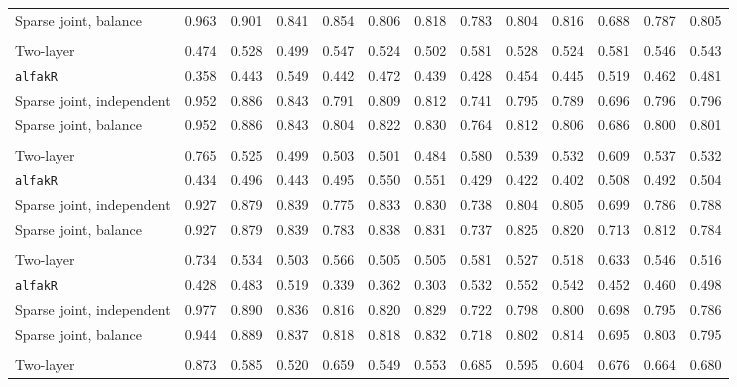 \begin{center}
\begin{tabular}{l*{12}{r}}
\quad Sparse joint, balance & 0.963 & 0.901 & 0.841 & 0.854 & 0.806 & 0.818 & 0.783 & 0.804 & 0.816 & 0.688 & 0.787 & 0.805 \\
\addlinespace[2pt]
\multicolumn{13}{l}{\textit{500/700, 360 d}} \\
\quad Two-layer & 0.474 & 0.528 & 0.499 & 0.547 & 0.524 & 0.502 & 0.581 & 0.528 & 0.524 & 0.581 & 0.546 & 0.543 \\
\quad \texttt{alfakR} & 0.358 & 0.443 & 0.549 & 0.442 & 0.472 & 0.439 & 0.428 & 0.454 & 0.445 & 0.519 & 0.462 & 0.481 \\
\quad Sparse joint, independent & 0.952 & 0.886 & 0.843 & 0.791 & 0.809 & 0.812 & 0.741 & 0.795 & 0.789 & 0.696 & 0.796 & 0.796 \\
\quad Sparse joint, balance & 0.952 & 0.886 & 0.843 & 0.804 & 0.822 & 0.830 & 0.764 & 0.812 & 0.806 & 0.686 & 0.800 & 0.801 \\
\addlinespace[2pt]
\multicolumn{13}{l}{\textit{500/700, 1080 d}} \\
\quad Two-layer & 0.765 & 0.525 & 0.499 & 0.503 & 0.501 & 0.484 & 0.580 & 0.539 & 0.532 & 0.609 & 0.537 & 0.532 \\
\quad \texttt{alfakR} & 0.434 & 0.496 & 0.443 & 0.495 & 0.550 & 0.551 & 0.429 & 0.422 & 0.402 & 0.508 & 0.492 & 0.504 \\
\quad Sparse joint, independent & 0.927 & 0.879 & 0.839 & 0.775 & 0.833 & 0.830 & 0.738 & 0.804 & 0.805 & 0.699 & 0.786 & 0.788 \\
\quad Sparse joint, balance & 0.927 & 0.879 & 0.839 & 0.783 & 0.838 & 0.831 & 0.737 & 0.825 & 0.820 & 0.713 & 0.812 & 0.784 \\
\addlinespace[2pt]
\multicolumn{13}{l}{\textit{500/700, bottleneck}} \\
\quad Two-layer & 0.734 & 0.534 & 0.503 & 0.566 & 0.505 & 0.505 & 0.581 & 0.527 & 0.518 & 0.633 & 0.546 & 0.516 \\
\quad \texttt{alfakR} & 0.428 & 0.483 & 0.519 & 0.339 & 0.362 & 0.303 & 0.532 & 0.552 & 0.542 & 0.452 & 0.460 & 0.498 \\
\quad Sparse joint, independent & 0.977 & 0.890 & 0.836 & 0.816 & 0.820 & 0.829 & 0.722 & 0.798 & 0.800 & 0.698 & 0.795 & 0.786 \\
\quad Sparse joint, balance & 0.944 & 0.889 & 0.837 & 0.818 & 0.818 & 0.832 & 0.718 & 0.802 & 0.814 & 0.695 & 0.803 & 0.795 \\
\addlinespace[2pt]
\multicolumn{13}{l}{\textit{100/3000, 360 d}} \\
\quad Two-layer & 0.873 & 0.585 & 0.520 & 0.659 & 0.549 & 0.553 & 0.685 & 0.595 & 0.604 & 0.676 & 0.664 & 0.680 \\

\end{tabular}
\end{center}
